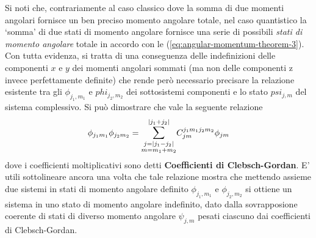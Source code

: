 Si noti che, contrariamente al caso classico dove la somma di due momenti angolari fornisce un ben preciso momento angolare totale, nel
caso quantistico la ‘somma’ di due stati di momento angolare fornisce una serie di possibili \emph{stati di momento angolare} 
totale in accordo con le (\ref{eq:angular-momentum-theorem-3}). 
Con tutta evidenza, si tratta di una conseguenza delle indefinizioni delle componenti $x$ e $y$ dei momenti angolari sommati 
(ma non delle componenti z invece perfettamente definite) che rende però necessario precisare la relazione esistente tra gli
$ \phi_{j_1,m_1}$ e $ phi_{j_2,m_2}$ dei sottosistemi componenti e lo stato $ psi_{j,m}$ del sistema complessivo. 
Si può dimostrare che vale la seguente relazione
\begin{equation}
    \phi_{j_{1}m_{1}} \phi_{j_{2}m_{2}} = \mathlarger{\sum}_{\substack{j=| j_{1}-j_{2}| \\ m = m_{1}+m_{2}} }^{| j_{1}+j_{2}|} C_{jm}^{j_{1}m_{1}j_{2}m_{2}} \phi_{jm}
   \label{eq:clebsch-gordan-def}
\end{equation}
dove i coefficienti moltiplicativi sono detti \textbf{Coefficienti di Clebsch-Gordan}.
E’ utili sottolineare ancora una volta che tale relazione mostra che mettendo assieme due sistemi in stati di momento angolare definito $\phi_{j_{1},m_{1}}$ e $\phi_{j_{2},m_{2}}$ si ottiene un sistema in uno stato di momento angolare indefinito, dato dalla sovrapposione coerente di stati di diverso momento angolare $\psi_{j,m}$ pesati ciascuno dai coefficienti di Clebsch-Gordan.

